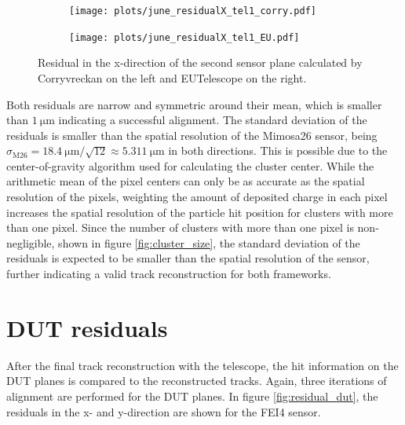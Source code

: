 \begin{figure}
  \hspace{-2.5cm}
  \begin{subfigure}{0.62\textwidth}
      \texttt{[image: plots/june\_residualX\_tel1\_corry.pdf]}
  \end{subfigure}
  \begin{subfigure}{0.62\textwidth}
      \hspace{0.95cm}
      \texttt{[image: plots/june\_residualX\_tel1\_EU.pdf]}
  \end{subfigure}
  \caption{Residual in the x-direction of the second sensor plane calculated by Corryvreckan on the left and EUTelescope on the right.}
  \label{fig:residualX}
\end{figure}

Both residuals are narrow and symmetric around their mean, which is smaller than $\SI{1}{\micro\meter}$ indicating a successful
alignment. The standard deviation of the residuals is smaller than the spatial resolution of the Mimosa26 sensor, being
$\sigma_{\text{M26}} = \SI{18.4}{\micro\meter}/\sqrt{12} \approx \SI{5.311}{\micro\meter}$ in both directions. This is possible due to
the center-of-gravity algorithm used for calculating the cluster center. While the arithmetic mean of the pixel centers can
only be as accurate as the spatial resolution of the pixels, weighting the amount of deposited charge in each pixel increases the
spatial resolution of the particle hit position for clusters with more than one pixel. Since the number of clusters with more than
one pixel is non-negligible, shown in figure \ref{fig:cluster_size}, the standard deviation of the residuals is expected to be
smaller than the spatial resolution of the sensor, further indicating a valid track reconstruction for both frameworks.

\section{DUT residuals}
After the final track reconstruction with the telescope, the hit information on the DUT planes is compared to the
reconstructed tracks. Again, three iterations of alignment are performed for the DUT planes. In figure \ref{fig:residual_dut}, the residuals in the
x- and y-direction are shown for the FEI4 sensor.

